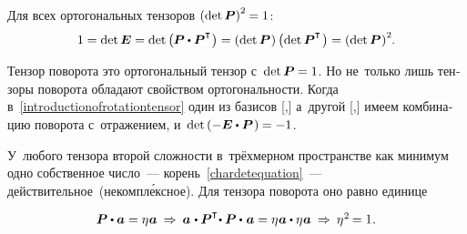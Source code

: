 \begin{otherlanguage}{russian}
Для всех ортогональных тензоров ${\left(\operatorname{det} \bm{P}\right)^2 \hspace{-0.1ex} = 1}$:
\vspace{0.1em}\[
1 = \operatorname{det} \bm{E} = \operatorname{det} \left({\hspace{-0.1ex} \bm{P} \dotp \bm{P}^{\T} \hspace{0.1ex}}\right) =
\left({\operatorname{det} \bm{P} \hspace{0.1ex}}\right) \left({\operatorname{det} \bm{P}^{\T} \hspace{0.2ex}}\right) =
\left(\operatorname{det} \bm{P} \hspace{0.1ex} \right)^2 \hspace{-0.1ex} \!.
\]

Тензор поворота это ортогональный тензор с~${\operatorname{det} \bm{P} \hspace{-0.1ex} = 1}$. Но не~только лишь тензоры поворота обладают свойством ортогональности. Когда в~\eqref{introductionofrotationtensor} один из базисов [,] а~другой [,] имеем комбинацию поворота с~отражением, и~${\operatorname{det} \left( -\bm{E} \dotp \bm{P} \hspace{0.16ex} \right) \hspace{-0.1ex} = -1}$.

У~любого тензора второй сложности в~трёхмерном пространстве как минимум одно собственное число~--- корень~\eqref{chardetequation}~--- действительное~(некомпл\'{е}ксное).
Для тензора поворота оно равно единице

\nopagebreak\vspace{-0.1em}\begin{equation*}\begin{array}{c}
\bm{P} \dotp \bm{a} = \eigenvalue \bm{a} \:\Rightarrow\:
\tikzmark{BeginPaBrace} \bm{a} \hspace{0.16ex} \dotp \tikzmark{BeginEBrace} \bm{P}^{\T} \tikzmark{EndPaBrace} \hspace{-0.4ex} \dotp \bm{P} \hspace{-0.32ex}\tikzmark{EndEBrace}\hspace{0.32ex} \dotp \hspace{0.16ex} \bm{a} = \eigenvalue \bm{a} \dotp \eigenvalue \bm{a}
\:\Rightarrow\: \eigenvalue^{2} \hspace{-0.2ex} = 1 \hspace{.1ex} .
\end{array}\end{equation*}


\end{otherlanguage}
